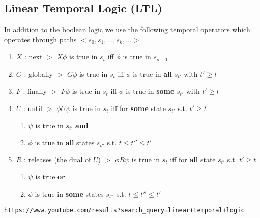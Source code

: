 \documentclass[11pt]{article}
\begin{document}
\subsection{Linear Temporal Logic (LTL)} %
\label{sub:linear_temporal_logic_ltl_}
In addition to the boolean logic we use the following temporal operators which operates through paths $<s_0, s_1, \ldots, s_k, \ldots>$.
\begin{enumerate}
	\item $X$ : next $>$ $X \phi$ is true in $s_t$ iff $\phi$ is true in $s_{s+1}$
	
	\item $G$ : globally $>$ $G \phi$ is true in $s_t$ iff $\phi$ is true in \textbf{all} $s_{t'}$ with $t' \geq t$
	
	\item $F$ : finally $>$ $F \phi$ is true in $s_t$ iff $\phi$ is true in \textbf{some} $s_{t'}$ with $t' \geq t$

	\item $U$ : until $>$ $\phi U \psi$ is true in $s_t$ iff for \textbf{some} state $s_{t'}$ s.t. $t' \geq t$ \begin{enumerate}
		\item $\psi$ is true in $s_{t'}$ \textbf{and}
		\item $\phi$ is true in \textbf{all} states $s_{t''}$ s.t. $t \leq t'' \leq t'$
	\end{enumerate}

	\item $R$ : releases (the dual of $U$) $>$ $\phi R \psi$ is true in $s_t$ iff for \textbf{all} state $s_{t'}$ s.t. $t' \geq t$ \begin{enumerate}
		\item $\psi$ is true \textbf{or}
		\item $\phi$ is true in \textbf{some} states $s_{t''}$ s.t. $t \leq t'' \leq t'$
	\end{enumerate}
\end{enumerate}


\texttt{https://www.youtube.com/results?search\_query=linear+temporal+logic}
\end{document}
